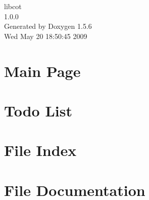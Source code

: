 \documentclass[a4paper]{book}
\begin{document}
\begin{titlepage}
\vspace*{7cm}
\begin{center}
{\Large libcot \\[1ex]\large 1.0.0 }\\
\vspace*{1cm}
{\large Generated by Doxygen 1.5.6}\\
\vspace*{0.5cm}
{\small Wed May 20 18:50:45 2009}\\
\end{center}
\end{titlepage}
\clearemptydoublepage
{}
\tableofcontents
\clearemptydoublepage
{}
\chapter{Main Page}
\label{index}\hypertarget{index}{}
\chapter{Todo List}
\label{todo}
\hypertarget{todo}{}

\chapter{File Index}

\chapter{File Documentation}










\printindex
\end{document}
